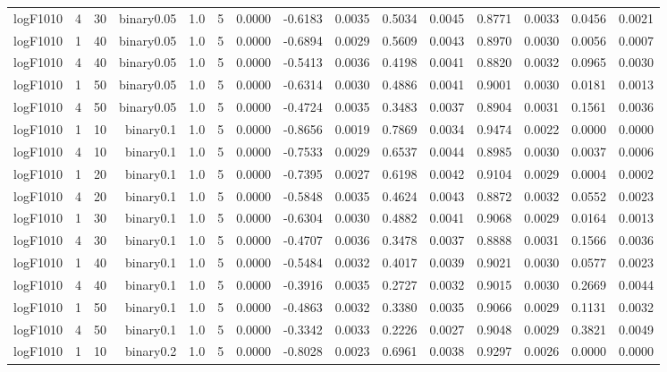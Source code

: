 \begin{longtable}{rrrrrrrrrrrrrrr}
  logF1010 & 4 & 30 & binary0.05 & 1.0 & 5 & 0.0000 & -0.6183 & 0.0035 & 0.5034 & 0.0045 & 0.8771 & 0.0033 & 0.0456 & 0.0021 \\ 
  logF1010 & 1 & 40 & binary0.05 & 1.0 & 5 & 0.0000 & -0.6894 & 0.0029 & 0.5609 & 0.0043 & 0.8970 & 0.0030 & 0.0056 & 0.0007 \\ 
  logF1010 & 4 & 40 & binary0.05 & 1.0 & 5 & 0.0000 & -0.5413 & 0.0036 & 0.4198 & 0.0041 & 0.8820 & 0.0032 & 0.0965 & 0.0030 \\ 
  logF1010 & 1 & 50 & binary0.05 & 1.0 & 5 & 0.0000 & -0.6314 & 0.0030 & 0.4886 & 0.0041 & 0.9001 & 0.0030 & 0.0181 & 0.0013 \\ 
  logF1010 & 4 & 50 & binary0.05 & 1.0 & 5 & 0.0000 & -0.4724 & 0.0035 & 0.3483 & 0.0037 & 0.8904 & 0.0031 & 0.1561 & 0.0036 \\ 
  logF1010 & 1 & 10 & binary0.1 & 1.0 & 5 & 0.0000 & -0.8656 & 0.0019 & 0.7869 & 0.0034 & 0.9474 & 0.0022 & 0.0000 & 0.0000 \\ 
  logF1010 & 4 & 10 & binary0.1 & 1.0 & 5 & 0.0000 & -0.7533 & 0.0029 & 0.6537 & 0.0044 & 0.8985 & 0.0030 & 0.0037 & 0.0006 \\ 
  logF1010 & 1 & 20 & binary0.1 & 1.0 & 5 & 0.0000 & -0.7395 & 0.0027 & 0.6198 & 0.0042 & 0.9104 & 0.0029 & 0.0004 & 0.0002 \\ 
  logF1010 & 4 & 20 & binary0.1 & 1.0 & 5 & 0.0000 & -0.5848 & 0.0035 & 0.4624 & 0.0043 & 0.8872 & 0.0032 & 0.0552 & 0.0023 \\ 
  logF1010 & 1 & 30 & binary0.1 & 1.0 & 5 & 0.0000 & -0.6304 & 0.0030 & 0.4882 & 0.0041 & 0.9068 & 0.0029 & 0.0164 & 0.0013 \\ 
  logF1010 & 4 & 30 & binary0.1 & 1.0 & 5 & 0.0000 & -0.4707 & 0.0036 & 0.3478 & 0.0037 & 0.8888 & 0.0031 & 0.1566 & 0.0036 \\ 
  logF1010 & 1 & 40 & binary0.1 & 1.0 & 5 & 0.0000 & -0.5484 & 0.0032 & 0.4017 & 0.0039 & 0.9021 & 0.0030 & 0.0577 & 0.0023 \\ 
  logF1010 & 4 & 40 & binary0.1 & 1.0 & 5 & 0.0000 & -0.3916 & 0.0035 & 0.2727 & 0.0032 & 0.9015 & 0.0030 & 0.2669 & 0.0044 \\ 
  logF1010 & 1 & 50 & binary0.1 & 1.0 & 5 & 0.0000 & -0.4863 & 0.0032 & 0.3380 & 0.0035 & 0.9066 & 0.0029 & 0.1131 & 0.0032 \\ 
  logF1010 & 4 & 50 & binary0.1 & 1.0 & 5 & 0.0000 & -0.3342 & 0.0033 & 0.2226 & 0.0027 & 0.9048 & 0.0029 & 0.3821 & 0.0049 \\ 
  logF1010 & 1 & 10 & binary0.2 & 1.0 & 5 & 0.0000 & -0.8028 & 0.0023 & 0.6961 & 0.0038 & 0.9297 & 0.0026 & 0.0000 & 0.0000 \\ 

\end{longtable}
